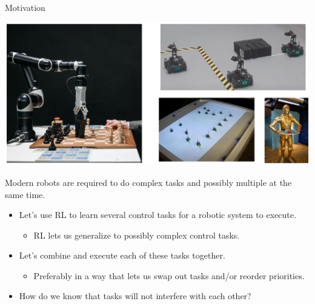 \begin{frame}{Motivation}
	\begin{minipage}{\textwidth}
		\centering		
		\includegraphics[width=0.85\linewidth]{motivationsCombined}
	\end{minipage}%
	\seprule
	Modern robots are required to do complex tasks and possibly multiple at the same time.
\end{frame}

\begin{frame}
	\begin{itemize}
		\item{Let's use RL to learn several control tasks for a robotic system to execute.}
			\begin{itemize}
				\item{ RL lets us generalize to possibly complex control tasks.}
			\end{itemize}
		\item{Let's combine and execute each of these tasks together.}
			\begin{itemize}
				\item{Preferably in a way that lets us swap out tasks and/or reorder priorities.}
			\end{itemize}
		\item{ { \color{red} How do we know that tasks will not interfere with each other? } }
	\end{itemize}
\end{frame}

